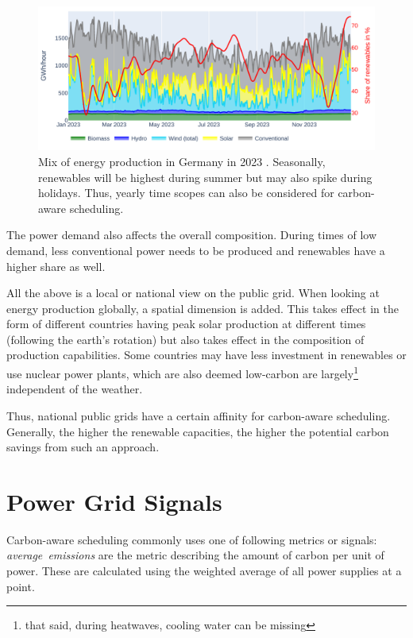 \begin{figure}
    \includegraphics[width=\linewidth]{agorameter/energy_production_year.pdf}
    \caption[short]{Mix of energy production in Germany in 2023 . Seasonally, renewables will be highest during summer but may also spike during holidays. Thus, yearly time scopes can also be considered for carbon-aware scheduling.}
    \label{fig:energy_mix_year}
\end{figure}

The power demand also affects the overall composition. 
During times of low demand, less conventional power needs to be produced and renewables have a higher share as well.

All the above is a local or national view on the public grid. 
When looking at energy production globally, a spatial dimension is added. 
This takes effect in the form of different countries having peak solar production at different times (following the earth's rotation) but also takes effect in the composition of production capabilities.
Some countries may have less investment in renewables or use nuclear power plants, which are also deemed low-carbon are largely\footnote{that said, during heatwaves, cooling water can be missing } independent of the weather.

Thus, national public grids have a certain affinity for carbon-aware scheduling\cite{wiesner_lets_2021}. Generally, the higher the renewable capacities, the higher the potential carbon savings from such an approach. 

\section{Power Grid Signals}
Carbon-aware scheduling commonly uses one of following metrics or signals: \emph{average~emissions} are the metric describing the amount of carbon per unit of power. These are calculated using the weighted average of all power supplies at a point.

